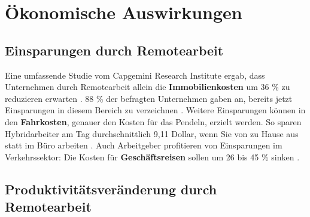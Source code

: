 \documentclass[runningheads]{llncs}
\begin{document}




\section{Ökonomische Auswirkungen}


\subsection{Einsparungen durch Remotearbeit}

Eine umfassende Studie vom Capgemini Research Institute ergab, dass Unternehmen durch Remotearbeit allein die \textbf{Immobilienkosten} um 36 \% zu reduzieren erwarten \cite{capgemini_research_institute_future_2020}.
88 \% der befragten Unternehmen gaben an, bereits jetzt Einsparungen in diesem Bereich zu verzeichnen \cite{capgemini_research_institute_future_2020}.
Weitere Einsparungen können in den \textbf{Fahrkosten}, genauer den Kosten für das Pendeln, erzielt werden.
So sparen Hybridarbeiter am Tag durchschnittlich 9,11 Dollar, wenn Sie von zu Hause aus statt im Büro arbeiten \cite{owl_labs_state_2022}.
Auch Arbeitgeber profitieren von Einsparungen im Verkehrssektor:
Die Kosten für \textbf{Geschäftsreisen} sollen um 26 bis 45 \% sinken \cite{capgemini_research_institute_future_2020}.

\subsection{Produktivitätsveränderung durch Remotearbeit}
\end{document}
